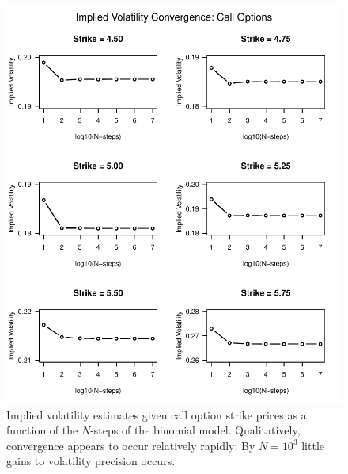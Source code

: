 \documentclass[12pt]{article}
\begin{document}
\begin{figure}[H]
	\centering
 	\includegraphics{../plots/call_convergence.pdf}
\caption{Implied volatility estimates given call option strike prices as a function of the $N$-steps of the binomial model. Qualitatively, convergence appears to occur relatively rapidly: By $N = 10^3$ little gains to volatility precision occurs.}
\label{fig:callconv}
\end{figure}
\end{document}
